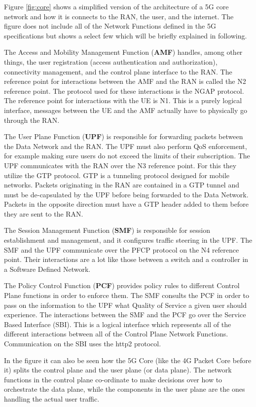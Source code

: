 Figure \ref{fig:core} shows a simplified version of the architecture of a 5G core network and how it is connects to the RAN, the user, and the internet. The figure does not include all of the Network Functions defined in the 5G specifications but shows a select few which will be briefly explained in following.

The Access and Mobility Management Function (\textbf{AMF}) handles, among other things, the user registration (access authentication and authorization), connectivity management, and the control plane interface to the RAN. The reference point for interactions between the AMF and the RAN is called the N2 reference point. The protocol used for these interactions is the NGAP protocol. The reference point for interactions with the UE is N1. This is a purely logical interface, messages between the UE and the AMF actually have to physically go through the RAN.

The User Plane Function (\textbf{UPF}) is responsible for forwarding packets between the Data Network and the RAN. The UPF must also perform QoS enforcement, for example making sure users do not exceed the limits of their subscription. The UPF communicates with the RAN over the N3 reference point. For this they utilize the GTP protocol. GTP is a tunneling protocol designed for mobile networks. Packets originating in the RAN are contained in a GTP tunnel and must be de-capsulated by the UPF before being forwarded to the Data Network. Packets in the opposite direction must have a GTP header added to them before they are sent to the RAN.

The Session Management Function (\textbf{SMF}) is responsible for session establishment and management, and it configures traffic steering in the UPF. The SMF and the UPF communicate over the PFCP protocol on the N4 reference point. Their interactions are a lot like those between a switch and a controller in a Software Defined Network.

The Policy Control Function (\textbf{PCF}) provides policy rules to different Control Plane functions in order to enforce them. The SMF consults the PCF in order to pass on the information to the UPF what Quality of Service a given user should experience. The interactions between the SMF and the PCF go over the Service Based Interface (SBI). This is a logical interface which represents all of the different interactions between all of the Control Plane Network Functions. Communication on the SBI uses the http2 protocol.

In the figure it can also be seen how the 5G Core (like the 4G Packet Core before it) splits the control plane and the user plane (or data plane). The network functions in the control plane co-ordinate to make decisions over how to orchestrate the data plane, while the components in the user plane are the ones handling the actual user traffic.

